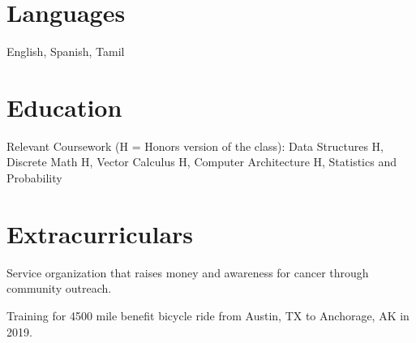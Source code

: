 \documentclass[]{deedy-resume-openfont}
\begin{document}
\begin{minipage}[t]{0.33\textwidth}

\vspace{2 mm}
\section{Languages}
English, Spanish, Tamil \\

%
%

\end{minipage} 
\hfill
\begin{minipage}[t]{0.66\textwidth} 


\section{Education}
\vspace{2 mm}
\vspace{\topsep} 
\begin{tightemize}
\item Relevant Coursework (H = Honors version of the class):
Data Structures H, Discrete Math H, Vector Calculus H, Computer Architecture H, Statistics and Probability
\end{tightemize}
\vspace{2 mm}


\section{Extracurriculars}
\vspace{2 mm}
\begin{tightemize}
\item Service organization that raises money and awareness for cancer through community outreach.
\item Training for 4500 mile benefit bicycle ride from Austin, TX to Anchorage, AK in 2019.
\end{tightemize}
\vspace{2 mm}


\end{minipage}
\end{document}
